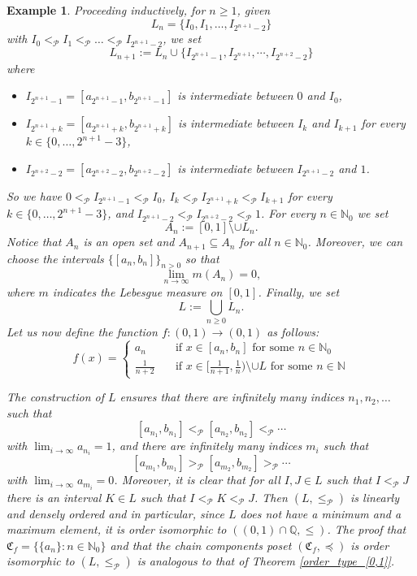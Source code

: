 \documentclass[pdflatex,sn-mathphys-num]{sn-jnl}
\theoremstyle{thmstyleone}%
\theoremstyle{thmstyletwo}%
\newtheorem{exa}{Example}%
\theoremstyle{thmstylethree}%
\begin{document}
\begin{exa}
\noindent Proceeding inductively, for $n\ge1$, given 
$$
L_n=\{I_0,I_1,\ldots,I_{2^{n+1}-2}\}
$$ 
with $I_0<_\mathcal{P} I_1<_\mathcal{P} \ldots <_\mathcal{P} I_{2^{n+1}-2}$, we set 
\[
L_{n+1}:=L_n\cup\{I_{2^{n+1}-1}, I_{2^{n+1}},\cdots , I_{2^{n+2}-2}\}
\]
where
\begin{itemize}
\item $I_{2^{n+1}-1}=[a_{2^{n+1}-1}, b_{2^{n+1}-1}]$ is intermediate between $0$ and $I_0$,
\item $I_{2^{n+1}+k}=[a_{2^{n+1}+k}, b_{2^{n+1}+k}]$ is intermediate between $I_k$ and $I_{k+1}$ for every $k\in\{0,\ldots,2^{n+1}-3\}$,
\item $I_{2^{n+2}-2}=[a_{2^{n+2}-2}, b_{2^{n+2}-2}]$ is intermediate between $I_{2^{n+1}-2}$ and $1$.
\end{itemize}
So we have $0<_\mathcal{P} I_{2^{n+1}-1} <_\mathcal{P} I_0$,
$I_k<_\mathcal{P} I_{2^{n+1}+k} <_\mathcal{P} I_{k+1}$ for every $k\in\{0,\ldots,2^{n+1}-3\}$, and $I_{2^{n+1}-2}<_\mathcal{P} I_{2^{n+2}-2} <_\mathcal{P} 1$.
For every $n\in\mathbb{N}_0$ we set 
$$
A_n:=[0,1]\setminus \cup L_n.
$$ 
Notice that $A_n$ is an open set and $A_{n+1}\subseteq A_{n}$ for all $n\in\mathbb{N}_0$. Moreover, we can choose the intervals $\{[a_n,b_n]\}_{n>0}$ so that 
\begin{equation*}
    \lim_{n\to\infty} m(A_n)=0,
\end{equation*}
where $m$ indicates the Lebesgue measure on $[0,1]$.
Finally, we set
\[
L:=\bigcup_{n\geq 0}L_n.
\]
Let us now define the function $f:(0,1)\to (0,1)$ as follows:
\begin{equation*}
    f(x)=
    \begin{cases}
        a_n \quad & \text{if $x\in [a_n,b_n]$ for some $n\in\mathbb{N}_0$}\\
        \frac{1}{n+2} \quad & \text{if $x\in [\frac{1}{n+1},\frac{1}{n})\setminus \cup L$ for some $n\in\mathbb{N}$}
    \end{cases}
\end{equation*}

\noindent The construction of $L$ ensures that there are infinitely many indices $n_1,n_2,\ldots$ such that
\[
[a_{n_1},b_{n_1}]<_\mathcal{P} [a_{n_2},b_{n_2}]<_\mathcal{P} \cdots
\]
with $\lim_{i\to\infty}a_{n_i}=1$, and there are infinitely many indices $m_i$ such that
\[
[a_{m_1},b_{m_1}]>_\mathcal{P} [a_{m_2},b_{m_2}]>_\mathcal{P}\cdots
\]
with $\lim_{i\to\infty}a_{m_i}=0$.
Moreover, it is clear that for all $I,J\in L$ such that $I<_\mathcal{P} J$ there is an interval $K\in L$ such that $I<_\mathcal{P} K<_\mathcal{P} J$. Then $(L,\le_\mathcal{P})$ is linearly and densely ordered and in particular, since $L$ does not have a minimum and a maximum element, it is order isomorphic to $((0,1)\cap\mathbb{Q},\leq)$.
The proof that $\mathfrak{C}_f=\{\{a_n\}: n\in\mathbb{N}_0\}$ and that the chain components poset $(\mathfrak{C}_f,\preceq)$ is order isomorphic to $(L,\le_\mathcal{P})$ is analogous to that of Theorem \ref{order_type_[0,1]}.
\end{exa}
\end{document}
